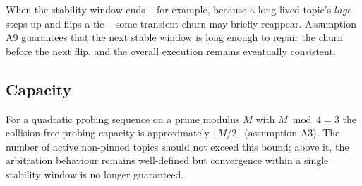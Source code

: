 When the stability window ends -- for example, because a long-lived topic's
$\mathit{lage}$ steps up and flips a tie -- some transient churn may briefly
reappear. Assumption A9 guarantees that the next stable window is long enough to
repair the churn before the next flip, and the overall execution remains eventually
consistent.

\subsection{Capacity}

For a quadratic probing sequence on a prime modulus $M$ with $M \bmod 4 = 3$ the
collision-free probing capacity is approximately $\lfloor M / 2 \rfloor$
(assumption A3). The number of active non-pinned topics should not exceed this
bound; above it, the arbitration behaviour remains well-defined but convergence
within a single stability window is no longer guaranteed.
